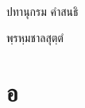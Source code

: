 \documentclass[10pt,twoside]{book}
\newcommand{\booktitle}{ปทานุกรม คำสนธิ}
\newcommand{\subtitle}{พฺรหฺมชาลสุตฺตํ}
\begin{document}
    \frontmatter
    
    \frontmatter
    \pagestyle{empty}

    \begin{titlepage}
        \centering
        
        ~
        
        \vspace{24pt}
        {\scshape\Huge \booktitle\par}
        \vspace{6pt}
        {\scshape\large \subtitle\par}
    \end{titlepage}
    \cleardoublepage
    

    \mainmatter
    \pagestyle{fancy}
    \needspace{5cm} \section*{อ}
\end{document}
